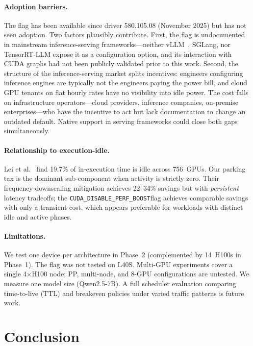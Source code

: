 \documentclass[sigconf,anonymous,review]{acmart}
\newcommand{\perfboost}{\texttt{CUDA\_\hspace{0pt}DISABLE\_\hspace{0pt}PERF\_\hspace{0pt}BOOST}}
\begin{document}
\paragraph{Adoption barriers.} The flag has been available since driver 580.105.08 (November 2025) but has not seen adoption. Two factors plausibly contribute. First, the flag is undocumented in mainstream inference-serving frameworks---neither vLLM~\cite{vllm}, SGLang, nor TensorRT-LLM expose it as a configuration option, and its interaction with CUDA graphs had not been publicly validated prior to this work. Second, the structure of the inference-serving market splits incentives: engineers configuring inference engines are typically not the engineers paying the power bill, and cloud GPU tenants on flat hourly rates have no visibility into idle power. The cost falls on infrastructure operators---cloud providers, inference companies, on-premise enterprises---who have the incentive to act but lack documentation to change an outdated default. Native support in serving frameworks could close both gaps simultaneously.

\paragraph{Relationship to execution-idle.} Lei et al.~\cite{lei-idle} find 19.7\% of in-execution time is idle across 756~GPUs. Our parking tax is the dominant sub-component when activity is strictly zero. Their frequency-downscaling mitigation achieves 22--34\% savings but with \emph{persistent} latency tradeoffs; the \perfboost flag achieves comparable savings with only a transient cost, which appears preferable for workloads with distinct idle and active phases.

\paragraph{Limitations.} We test one device per architecture in Phase~2 (complemented by 14~H100s in Phase~1). The flag was not tested on L40S. Multi-GPU experiments cover a single 4$\times$H100 node; PP, multi-node, and 8-GPU configurations are untested. We measure one model size (Qwen2.5-7B). A full scheduler evaluation comparing time-to-live (TTL) and breakeven policies under varied traffic patterns is future work.

\section{Conclusion}
\end{document}
